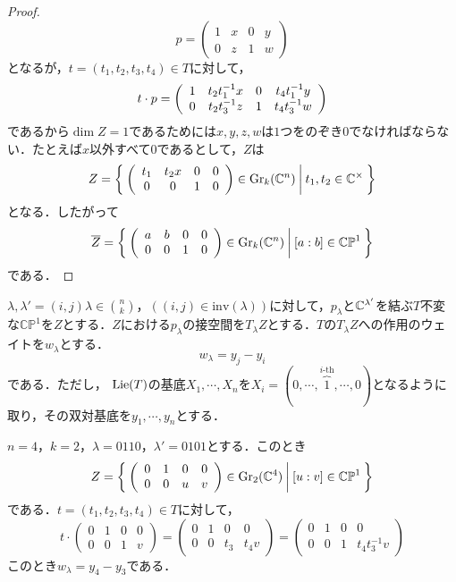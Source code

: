 \begin{proof}
  \[
  p=\left(\begin{array}{cccc}
    1 & x & 0 & y \\
    0 & z & 1 & w
  \end{array}\right)
  \]
  となるが，$t=(t_1,t_2,t_3,t_4)\in T$に対して，
  \[
  t\cdot p = \left(\begin{array}{cccc}
    1 & t_2t_1^{-1}x & 0 & t_4t_1^{-1}y \\
    0 & t_2t_3^{-1}z & 1 & t_4t_3^{-1}w 
  \end{array}\right)
  \]
  であるから$\dim Z=1$であるためには$x,y,z,w$は$1$つをのぞき$0$でなければならない．たとえば$x$以外すべて$0$であるとして，$Z$は
  \[
  Z=\left\{\:\left(\begin{array}{cccc}
    t_1 & t_2x & 0 & 0 \\
    0 & 0 & 1 & 0 
  \end{array}\right)\in\text{Gr}_k(\mathbb{C}^n)\:\middle|\:t_1,t_2\in\mathbb{C}^\times\:\right\}
  \]
  となる．したがって
  \[
  \overline{Z} = \left\{\:\left(\begin{array}{cccc}
    a & b & 0 & 0 \\
    0 & 0 & 1 & 0
  \end{array}\right)\in\text{Gr}_k(\mathbb{C}^n)\:\middle|\:[a:b]\in\mathbb{CP}^1\:\right\}
  \]
  である．
\end{proof}

$\lambda,\lambda'=(i,j)\lambda\in\binom{n}{k}$，$((i,j)\in\text{inv}(\lambda))$に対して，$p_\lambda$と$\mathbb{C}^{\lambda'}$を結ぶ$T$不変な$\mathbb{CP}^1$を$Z$とする．$Z$における$p_\lambda$の接空間を$T_\lambda Z$とする．$T$の$T_\lambda Z$への作用のウェイトを$w_\lambda$とする．
\[
w_\lambda = y_j-y_i
\]
である．ただし，  $\text{Lie} (T)$の基底$X_1,\cdots,X_n$を$X_i=(0,\cdots,\overbrace{1}^{i\text{-th}},\cdots,0)$となるように取り，その双対基底を$y_1,\cdots,y_n$とする．

\begin{eg}
  $n=4$，$k=2$，$\lambda=0110$，$\lambda'=0101$とする．このとき
  \[
  Z=\left\{\:
    \left(\begin{array}{cccc}
      0 & 1 & 0 & 0\\
      0 & 0 & u & v
    \end{array}\right)\in\text{Gr}_2(\mathbb{C}^4)
  \:\middle|\:[u:v]\in\mathbb{CP}^1\:\right\}
  \]
  である．$t=(t_1,t_2,t_3,t_4)\in T$に対して，
  \[
  t\cdot\left(\begin{array}{cccc}
    0 & 1 & 0 & 0\\
    0 & 0 & 1 & v
  \end{array}\right)=\left(\begin{array}{cccc}
    0 & 1 & 0 & 0\\
    0 & 0 & t_3 & t_4v
  \end{array}\right)=\left(\begin{array}{cccc}
    0 & 1 & 0 & 0\\
    0 & 0 & 1 & t_4t_3^{-1}v
  \end{array}\right)
  \]
  このとき$w_\lambda=y_4-y_3$である．
\end{eg}


